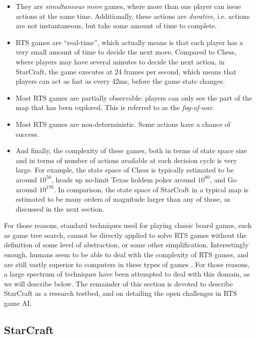 \documentclass{llncs}
\begin{document}
\begin{itemize}
\item  They are  {\em simultaneous  move} games,  where more  than one
  player  can issue  actions  at the  same  time. Additionally,  these
  actions are {\em durative}, i.e.  actions are not instantaneous, but
  take some amount of time to complete.
\item RTS games  are ``real-time'', which actually means  is that each
  player  has  a  very  small  amount  of  time  to  decide  the  next
  move. Compared to  Chess, where players may have  several minutes to
  decide the next action, in StarCraft, the game executes at 24 frames
  per second, which means that players  can act as fast as every 42ms,
  before the game state changes.
\item Most  RTS games are  partially observable: players can  only see
  the part of the  map that has been explored. This  is referred to as
  the {\em fog-of-war}.
\item Most RTS games are non-deterministic. Some actions have a chance
  of success.
\item And  finally, the complexity  of these  games, both in  terms of
  state space size and in terms of number of actions available at each
  decision cycle is very large. For  example, the state space of Chess
  is typically  estimated to  be around  $10^{50}$, heads  up no-limit
  Texas holdem  poker around $10^{80}$,  and Go around  $10^{170}$. In
  comparison,  the  state space  of  StarCraft  in  a typical  map  is
  estimated to be  many orders of magnitude larger than  any of those,
  as discussed in the next section.
\end{itemize}

For those reasons, standard techniques  used for playing classic board
games, such as  game tree search, cannot be directly  applied to solve
RTS games without the definition of some level of abstraction, or some
other simplification. Interestingly enough, humans  seem to be able to
deal with the  complexity of RTS games, and are  still vastly superior
to       computers      in       these       types      of       games
\cite{burochurchill2012aimagazine}.   For  those   reasons,  a   large
spectrum of techniques  have been attempted to deal  with this domain,
as we will describe below. The remainder of this section is devoted to
describe StarCraft  as a research  testbed, and on detailing  the open
challenges in RTS game AI.

\subsection{StarCraft}\label{subsec:StarCraft}
\end{document}
